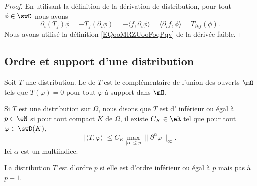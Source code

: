 \begin{proof}
    En utilisant la définition de la dérivation de distribution, pour tout \( \phi\in \swD\) nous avons
    \begin{equation}
        \partial_i(T_f)\phi=-T_f(\partial_i\phi)=-\langle f, \partial_i\phi\rangle =\langle \partial_if, \phi\rangle =T_{\partial_if}(\phi).
    \end{equation}
    Nous avons utilisé la définition \eqref{EQooMRZUooFoqPqv} de la dérivée faible.
\end{proof}

\subsection{Ordre et support d'une distribution}

\begin{definition}        \label{DefVILMooBIYerO}
    Soit \( T\) une distribution. Le  de \( T\) est le complémentaire de l'union des ouverts \( \mO\) tels que \( T(\varphi)=0\) pour tout \( \varphi\) à support dans \( \mO\).
\end{definition}

\begin{definition}  \label{DefXAHIooFeiRMB}
    Si \( T\) est une distribution sur \( \Omega\), nous disons que \( T\) est d' inférieur ou égal à \( p\in \eN\) si pour tout compact \( K\) de \( \Omega\), il existe \( C_K\in \eR\) tel que pour tout \( \varphi\in \swD(K)\),
    \begin{equation}
        \big| \langle T, \varphi\rangle  \big|\leq C_K\max_{| \alpha |\leq p}\| \partial^{\alpha}\varphi \|_{\infty}.
    \end{equation}
    Ici \( \alpha\) est un multiindice.

    La distribution \( T\) est d'ordre \( p\) si elle est d'ordre inférieur ou égal à \( p\) mais pas à \( p-1\).
\end{definition}

